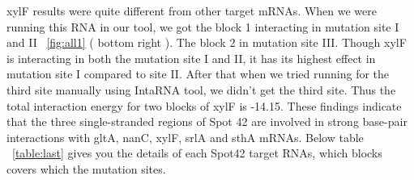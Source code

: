 \documentclass[twoside,a4paper]{report}
\numberwithin{equation}{section}
\begin{document}
 xylF results were quite different from other target mRNAs. When we were running this RNA in our tool, we got the block 1 interacting in mutation site I and II ~\ref{fig:all1} ( bottom right ). The block 2 in mutation site III. Though xylF is interacting in both the mutation site I and II, it has its highest effect in mutation site I compared to site II. After that when we tried running for the third site manually using IntaRNA tool, we didn't get the third site. Thus the total interaction energy for two blocks of xylF is -14.15. These findings indicate that the three single-stranded regions of Spot 42 are involved in strong base-pair interactions with gltA, nanC, xylF, srlA and sthA mRNAs. Below table ~\ref{table:last} gives you the details of each Spot42 target RNAs, which blocks covers which the mutation sites.\\
\end{document}
